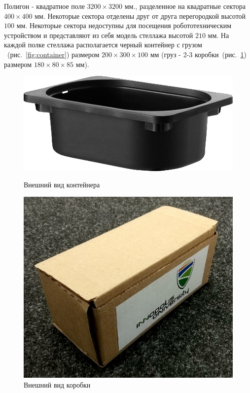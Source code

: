 Полигон - квадратное поле $3200\times3200$ мм., разделенное на квадратные сектора $400 \times 400$ мм.
Некоторые сектора отделены друг от друга перегородкой высотой $100$ мм.
Некоторые сектора недоступны для посещения робототехническим устройством и представляют из себя 
модель стеллажа высотой $210$ мм.
На каждой полке стеллажа располагается черный контейнер с грузом ~(рис.~\ref{fig:container}) размером
$200 \times 300 \times 100$ мм (груз - 2-3 коробки~(рис.~\ref{fig:box}) размером $180 \times 80 \times 85$ мм).


\begin{figure}[h]
\begin{center}
\begin{minipage}[h]{0.5\linewidth}
\includegraphics[width=1\linewidth]{final/command_tour/irs/sources/container}
\caption{Внешний вид контейнера}
\label{fig:container} 
\end{minipage}
\hfill 
\begin{minipage}[h]{0.4\linewidth}
\includegraphics[width=1\linewidth]{final/command_tour/irs/sources/box}
\caption{Внешний вид коробки}
\label{fig:box}
\end{minipage}
\end{center}
\end{figure}

